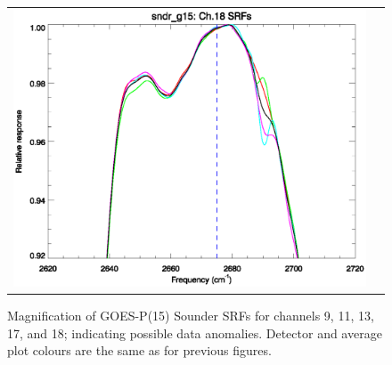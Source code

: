 \begin{figure}[htp]
\begin{tabular}{c c}
    \includegraphics[scale=0.5]{graphics/zoom_anomaly/sndr_g15.ch18.srf.eps} &
  \end{tabular}
  \caption{Magnification of GOES-P(15) Sounder SRFs for channels 9, 11, 13, 17, and 18; indicating possible data anomalies. Detector and average plot colours are the same as for previous figures.}
  \label{fig:sndr_g15.zoom_anomaly}
\end{figure}


